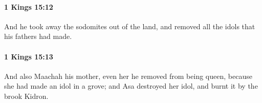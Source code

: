		\paragraph{1 Kings 15:12} %
			\label{1KINGS-15-12}

			And he took away the sodomites out of the land, and removed all the idols that his fathers had made.


		\paragraph{1 Kings 15:13} %
			\label{1KINGS-15-13}

			And also Maachah his mother, even her he removed from being queen, because she had made an idol in a grove; and Asa destroyed her idol, and burnt it by the brook Kidron.


